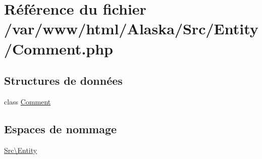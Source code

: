\hypertarget{_comment_8php}{}\section{Référence du fichier /var/www/html/\+Alaska/\+Src/\+Entity/\+Comment.php}
\label{_comment_8php}
\subsection*{Structures de données}
\begin{DoxyCompactItemize}
\item 
class \hyperlink{class_src_1_1_entity_1_1_comment}{Comment}
\end{DoxyCompactItemize}
\subsection*{Espaces de nommage}
\begin{DoxyCompactItemize}
\item 
 \hyperlink{namespace_src_1_1_entity}{Src\textbackslash{}\+Entity}
\end{DoxyCompactItemize}
